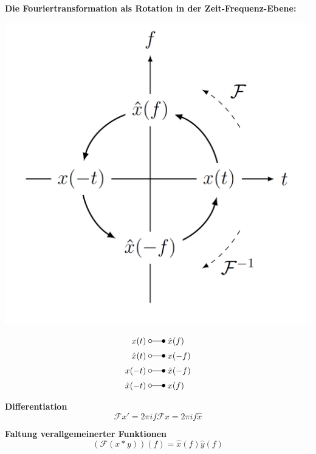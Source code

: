 \textbf{Die Fouriertransformation als Rotation in der Zeit-Frequenz-Ebene:}
\begin{center}
    \includegraphics[width=0.6\linewidth]{img/FT_Rotation.png}
\end{center}
\begin{align*}
    x(t) \;&\laplace\; \hat{x}(f) \\
    \hat{x}(t) \;&\laplace\; x(-f) \\
    x(-t) \;&\laplace\; \hat{x}(-f) \\
    \hat{x}(-t)\;&\laplace\; x(f)
\end{align*}

\textbf{Differentiation}
\begin{equation}
    \mathcal{F}x'=2\pi if\mathcal{F}x=2\pi if\hat{x}
\end{equation}

\textbf{Faltung verallgemeinerter Funktionen}
\begin{equation}
    (\mathcal{F}(x*y))(f) = \hat{x}(f)\hat{y}(f)
\end{equation}